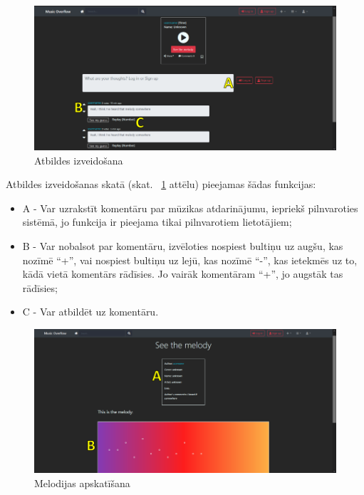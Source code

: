 \documentclass[12pt]{article}
\begin{document}
\begin{figure}[H]
\begin{center}
	\includegraphics[scale=0.6]{comment1.png}
	\caption{Atbildes izveidošana}
	\label{fig:comment}
\end{center}
\end{figure}

Atbildes izveidošanas skatā (skat. ~\ref{fig:comment} attēlu) pieejamas šādas funkcijas:

\begin{itemize}
	\item A - Var uzrakstīt komentāru par mūzikas atdarinājumu, iepriekš pilnvaroties sistēmā, jo funkcija ir pieejama tikai pilnvarotiem lietotājiem;
    \item B - Var nobalsot par komentāru, izvēloties nospiest bultiņu uz augšu, kas nozīmē “+”, vai nospiest bultiņu uz lejū, kas nozīmē “-”, kas ietekmēs uz to, kādā vietā komentārs rādīsies. Jo vairāk komentāram “+”, jo augstāk tas rādīsies;
    \item C - Var atbildēt uz komentāru.	
\end{itemize}

\begin{figure}[H]
\begin{center}
	\includegraphics[scale=0.6]{seemelody.png}
	\caption{Melodijas apskatīšana}
	\label{fig:seemelody}
\end{center}
\end{figure}
\end{document}

